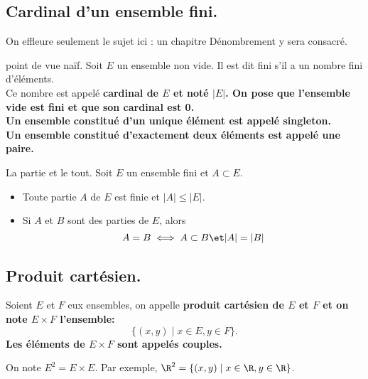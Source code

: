 \documentclass[11pt]{article}
\begin{document}
\subsection{Cardinal d'un ensemble fini.}

On effleure seulement le sujet ici : un chapitre Dénombrement y sera consacré.

\begin{defi}{point de vue naïf.}{}
    Soit $E$ un ensemble non vide. Il est dit fini s'il a un nombre fini d'éléments.\\
    Ce nombre est appelé \bf{cardinal} de $E$ et noté $|E|$. On pose que l'ensemble vide est fini et que son cardinal est 0.\\
    Un ensemble constitué d'un unique élément est appelé \bf{singleton}.\\
    Un ensemble constitué d'exactement deux éléments est appelé une \bf{paire}.
\end{defi}

\pagebreak

\begin{prop}{La partie et le tout.}{}
    Soit $E$ un ensemble fini et $A\subset E$.
    \begin{itemize}
        \item Toute partie $A$ de $E$ est finie et $|A|\leq|E|$.
        \item Si $A$ et $B$ sont des parties de $E$, alors
        \begin{equation*}
            A=B\iff A\subset B\et|A|=|B|
        \end{equation*}
    \end{itemize}
\end{prop}

\subsection{Produit cartésien.}

\begin{defi}{}{}
    Soient $E$ et $F$ eux ensembles, on appelle \bf{produit cartésien} de $E$ et $F$ et on note $E\times F$ l'ensemble:
    \begin{equation*}
        \{(x,y)\mid x\in E,y\in F\}.
    \end{equation*}
    Les éléments de $E\times F$ sont appelés \bf{couples}.
\end{defi}

\begin{nota}{}{}
    On note $E^2=E\times E$. Par exemple, $\R^2=\{(x,y)\mid x\in \R,y\in \R\}$.
\end{nota}
\end{document}
